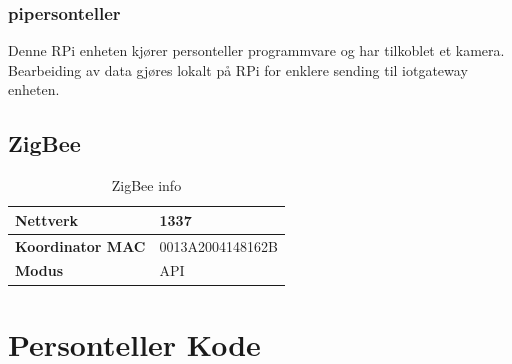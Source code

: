 \documentclass{article}
\begin{document}
\begin{appendices}
\subsubsection{pi\textunderscore personteller}
Denne RPi enheten kjører personteller programmvare og har tilkoblet et kamera. Bearbeiding av data gjøres lokalt på RPi for enklere sending til iot\textunderscore gateway enheten.

\subsection{ZigBee}

\begin{table}[!ht]
	\centering
	\caption{ZigBee info}
	\begin{tabular}{|l|l|}
		\hline
		\textbf{Nettverk} & 1337 \\ \hline
		\textbf{Koordinator MAC} &  0013A2004148162B\\ \hline
		\textbf{Modus} &  API\\ \hline
	\end{tabular}
\end{table}

\newpage
\section{Personteller Kode}
\begin{lstlisting}[language=Python, caption=person.py]


\end{lstlisting}

\begin{lstlisting}[language=Python, caption=videostream.py]


\end{lstlisting}


\begin{lstlisting}[language=Python, caption=personteller.py]


\end{lstlisting}


\end{appendices}
\newpage
\end{document}
